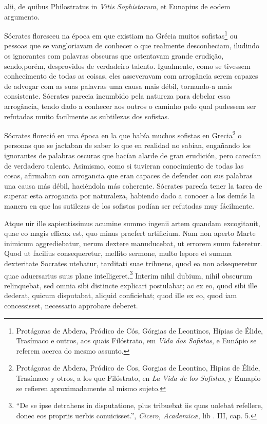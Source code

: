 \documentclass{article}
\begin{document}
\begin{paracol}{3}
\begin{nthcolumn*}{0}
{    alii, de quibus Philostratus in \emph{Vitis Sophistarum}, et Eunapius de eodem argumento.}
  \end{nthcolumn*}
  \vspace{0.5cm}
  \begin{nthcolumn}{1} %
    Sócrates floresceu na época em que existiam na Grécia muitos sofistas\footnote[17]{Protágoras de Abdera, Pródico de Cós, Górgias de Leontinos, Hípias de Élide, Trasímaco e outros, aos quais Filóstrato, em \emph{Vida dos Sofistas}, e Eunápio se referem acerca do mesmo assunto.} ou pessoas que se vangloriavam de conhecer o que realmente desconheciam, iludindo os ignorantes com palavras obscuras que ostentavam grande erudição, sendo,porém, desprovidos de verdadeiro talento. Igualmente, como se tivessem conhecimento de todas as coisas, eles asseveravam com arrogância serem capazes de advogar com as suas palavras uma causa mais débil, tornando-a mais consistente. Sócrates parecia incumbido pela natureza para debelar essa arrogância, tendo dado a conhecer aos outros o caminho pelo qual pudessem ser refutadas muito facilmente as subtilezas dos sofistas.
  \end{nthcolumn}
  \vspace{0.5cm}
  \begin{nthcolumn}{2} %
    Sócrates floreció en una época en la que había muchos sofistas en Grecia\footnote[17]{Protágoras de Abdera, Pródico de Cos, Gorgias de Leontino, Hipias de Élide, Trasímaco y otros, a los que Filóstrato, en \emph{La Vida de los Sofistas}, y Eunapio se refieren aproximadamente al mismo sujeto.} o personas que se jactaban de saber lo que en realidad no sabían, engañando los ignorantes de palabras oscuras que hacían alarde de gran erudición, pero carecían de verdadero talento. Asimismo, como si tuvieran conocimiento de todas las cosas, afirmaban con arrogancia que eran capaces de defender con sus palabras una causa más débil, haciéndola más coherente. Sócrates parecía tener la tarea de superar esta arrogancia por naturaleza, habiendo dado a conocer a los demás la manera en que las sutilezas de los sofistas podían ser refutadas muy fácilmente.    
  \end{nthcolumn}
  \vspace{0.5cm}
  \begin{nthcolumn*}{0} %
    Atque uir ille sapientissimus acumine summo ingenii artem quandam excogitauit, quae eo magis efficax est, quo minus praefert artificium. Nam non aperto Marte inimicum aggrediebatur, uerum dextere manuducebat, ut errorem suum fateretur. Quod ut facilius consequeretur, mellito sermone, multo lepore et summa dexteritate Socrates utebatur, tarditati suae tribuens, quod ea non adsequeretur quae aduersarius suus plane intelligeret.\footnote[18]{“De se ipse detrahens in disputatione, plus tribuebat iis quos uolebat refellere, donec eos propriis uerbis conuicisset.”, \emph{Cicero, Academicæ}, lib . III, cap. 5.} Interim nihil dubium, nihil obscurum relinquebat, sed omnia sibi distincte explicari postulabat; ac ex eo, quod sibi ille dederat, quicum disputabat, aliquid conficiebat; quod ille ex eo, quod iam concessisset, necessario approbare deberet.

\end{nthcolumn*}
\end{paracol}
\end{document}
